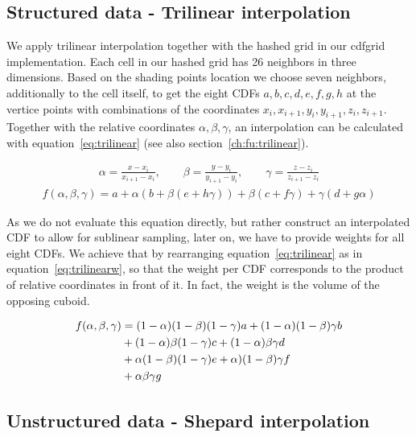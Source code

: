 \subsection{Structured data - Trilinear interpolation}
\label{ch:trilinear}

We apply trilinear interpolation together with the hashed grid in our cdfgrid implementation. Each cell in our hashed grid has 26 neighbors in three dimensions. Based on the shading points location we choose seven neighbors, additionally to the cell itself, to get the eight CDFs $a,b,c,d,e,f,g,h$ at the vertice points with combinations of the coordinates $x_i, x_{i+1}, y_i, y_{i+1}, z_i, z_{i+1}$. Together with the relative coordinates $\alpha, \beta, \gamma$, an interpolation can be calculated with equation~\ref{eq:trilinear} (see also section~\ref{ch:fu:trilinear}).

\begin{align}
    \alpha = \frac{x-x_i}{x_{i+1}-x_i}, \qquad \beta = \frac{y-y_i}{y_{i+1}-y_i}, \qquad \gamma = \frac{z-z_i}{z_{i+1}-z_i}
\end{align}
\begin{align}\label{eq:trilinear}
    f(\alpha, \beta, \gamma) = a + \alpha\left(b + \beta(e + h\gamma)\right) + \beta(c + f\gamma) + \gamma(d + g\alpha)
\end{align}

As we do not evaluate this equation directly, but rather construct an interpolated CDF to allow for sublinear sampling, later on, we have to provide weights for all eight CDFs. We achieve that by rearranging equation~\ref{eq:trilinear} as in equation~\ref{eq:trilinearw}, so that the weight per CDF corresponds to the product of relative coordinates in front of it. In fact, the weight is the volume of the opposing cuboid.


\begin{align}\label{eq:trilinearw}
    f(\alpha, \beta, \gamma) &= (1-\alpha)(1-\beta)(1-\gamma)a + (1-\alpha)(1-\beta)\gamma b  \notag \\
    &+ (1-\alpha)\beta(1-\gamma)c  + (1-\alpha)\beta\gamma d \\
    &+ \alpha(1-\beta)(1-\gamma)e + \alpha)(1-\beta)\gamma f \notag \\
    &+ \alpha\beta\gamma g  \notag
\end{align}


\subsection{Unstructured data - Shepard interpolation}
\label{ch:unstructured}

